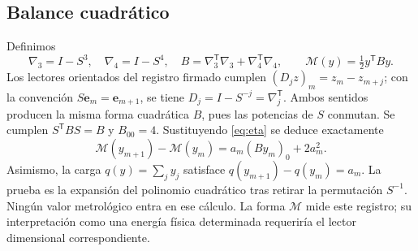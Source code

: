 \subsection{Balance cuadrático}
Definimos
\[
\nabla_3=I-S^3,\quad \nabla_4=I-S^4,\quad
B=\nabla_3^{\mathsf T}\nabla_3+\nabla_4^{\mathsf T}\nabla_4,\qquad
\mathcal M(y)=\tfrac12 y^{\mathsf T}By.
\]
Los lectores orientados del registro firmado cumplen
$(D_jz)_m=z_m-z_{m+j}$; con la convención
$S\mathbf e_m=\mathbf e_{m+1}$, se tiene
$D_j=I-S^{-j}=\nabla_j^{\mathsf T}$. Ambos sentidos producen la misma
forma cuadrática $B$, pues las potencias de $S$ conmutan.
Se cumplen $S^{\mathsf T}BS=B$ y $B_{00}=4$. Sustituyendo
\eqref{eq:eta} se deduce exactamente
\begin{equation}
\mathcal M(y_{m+1})-\mathcal M(y_m)
=a_m(By_m)_0+2a_m^2.
\label{ii:mem:balance}
\end{equation}
Asimismo, la carga $q(y)=\sum_jy_j$ satisface
$q(y_{m+1})-q(y_m)=a_m$.
La prueba es la expansión del polinomio cuadrático tras retirar la
permutación $S^{-1}$. Ningún valor metrológico entra en ese cálculo.
La forma $\mathcal M$ mide este registro; su interpretación como una
energía física determinada requeriría el lector dimensional correspondiente.




